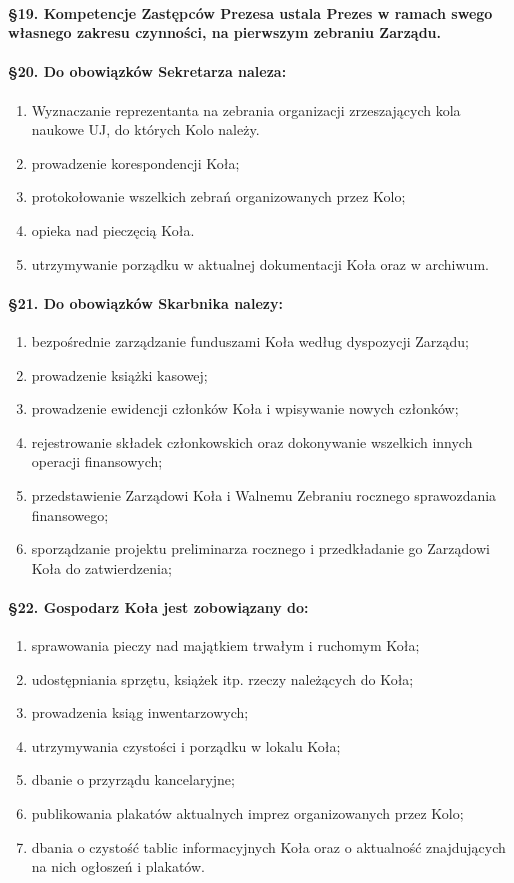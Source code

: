 \documentclass{article}
\begin{document}
		\paragraph{\S 19. Kompetencje Zastępców Prezesa ustala Prezes w ramach swego własnego zakresu czynności, na pierwszym zebraniu Zarządu.}
		\paragraph{\S 20. Do obowiązków Sekretarza naleza:}
		\begin{enumerate}
			\item Wyznaczanie reprezentanta na zebrania organizacji zrzeszających kola naukowe UJ, do których Kolo należy.
			\item prowadzenie korespondencji Koła;
			\item protokołowanie wszelkich zebrań organizowanych przez Kolo;
			\item opieka nad pieczęcią Koła.
			\item utrzymywanie porządku w aktualnej dokumentacji Koła oraz w archiwum.
		\end{enumerate}
		\paragraph{\S 21. Do obowiązków Skarbnika nalezy:}
		\begin{enumerate}
			\item bezpośrednie zarządzanie funduszami Koła według dyspozycji Zarządu;
			\item prowadzenie książki kasowej;
			\item prowadzenie ewidencji członków Koła i wpisywanie nowych członków;
			\item rejestrowanie składek członkowskich oraz dokonywanie wszelkich innych operacji finansowych;
			\item przedstawienie Zarządowi Koła i Walnemu Zebraniu rocznego sprawozdania finansowego;
			\item sporządzanie projektu preliminarza rocznego i przedkładanie go Zarządowi Koła do zatwierdzenia;
		\end{enumerate}
		\paragraph{\S 22. Gospodarz Koła jest zobowiązany do:}
		\begin{enumerate}
			\item sprawowania pieczy nad majątkiem trwałym i ruchomym Koła;
			\item udostępniania sprzętu, książek itp. rzeczy należących do Koła;
			\item prowadzenia ksiąg inwentarzowych;
			\item utrzymywania czystości i porządku w lokalu Koła;
			\item dbanie o przyrządu kancelaryjne;
			\item publikowania plakatów aktualnych imprez organizowanych przez Kolo;
			\item dbania o czystość tablic informacyjnych Koła oraz o aktualność znajdujących na nich ogłoszeń i plakatów.
		\end{enumerate}
\end{document}
